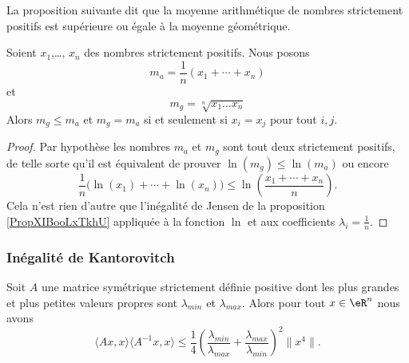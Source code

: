 La proposition suivante dit que la moyenne arithmétique de nombres strictement positifs est supérieure ou égale à la moyenne géométrique.
\begin{proposition}    \label{PropWDPooBtHIAR}
    Soient \( x_1\),\ldots, \( x_n\) des nombres strictement positifs. Nous posons
    \begin{equation}
        m_a=\frac{1}{ n }(x_1+\cdots +x_n)
    \end{equation}
    et
    \begin{equation}
        m_g=\sqrt[n]{x_1\ldots x_n}
    \end{equation}
    Alors \( m_g\leq m_a\) et \( m_g=m_a\) si et seulement si \( x_i=x_j\) pour tout \( i,j\).
\end{proposition}

\begin{proof}
    Par hypothèse les nombres \( m_a\) et \( m_g\) sont tout deux strictement positifs, de telle sorte qu'il est équivalent de prouver \( \ln(m_g)\leq \ln(m_a)\) ou encore
    \begin{equation}
        \frac{1}{ n }\big( \ln(x_1)+\cdots +\ln(x_n) \big)\leq \ln\left( \frac{ x_1+\cdots +x_n }{ n } \right).
    \end{equation}
    Cela n'est rien d'autre que l'inégalité de Jensen de la proposition \ref{PropXIBooLxTkhU} appliquée à la fonction \( \ln\) et aux coefficients \( \lambda_i=\frac{1}{ n }\).
\end{proof}

\subsubsection{Inégalité de Kantorovitch}

\begin{proposition}    \label{PropMNUooFbYkug}
    Soit \( A\) une matrice symétrique strictement définie positive dont les plus grandes et plus petites valeurs propres sont \( \lambda_{min}\) et \( \lambda_{max}\). Alors pour tout \( x\in \eR^n\) nous avons
    \begin{equation}
        \langle Ax, x\rangle \langle A^{-1}x, x\rangle \leq \frac{1}{ 4 }\left( \frac{ \lambda_{min} }{ \lambda_{max} }+\frac{ \lambda_{max} }{ \lambda_{min} } \right)^2\| x^4 \|.
    \end{equation}
\end{proposition}

